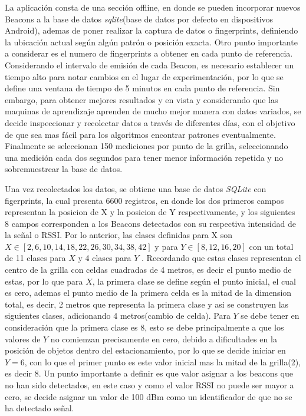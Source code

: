 La aplicación consta de una sección offline, en donde se pueden incorporar nuevos Beacons a la base de datos \textit{sqlite}(base de datos por defecto en dispositivos Android), ademas de poner realizar  la captura de datos o fingerprints, definiendo la ubicación actual según algún patrón o posición exacta. Otro punto importante a considerar es el numero de fingerprints a obtener en cada punto de referencia. Considerando el intervalo de emisión de cada Beacon, es necesario establecer un tiempo alto para notar cambios en el lugar de experimentación, por lo que se define una ventana de tiempo de 5 minutos en cada punto de referencia. Sin embargo, para obtener mejores resultados y en vista y considerando que las maquinas de aprendizaje aprenden de mucho mejor manera con datos variados, se decide inspeccionar y recolectar datos a través de diferentes días, con el objetivo de que sea mas fácil para los algoritmos encontrar patrones eventualmente. Finalmente se seleccionan 150 mediciones por punto de la grilla, seleccionando una medición cada dos segundos para tener menor información repetida y no sobremuestrear la base de datos.

Una vez recolectados los datos, se obtiene una base de datos \textit{SQLite} con figerprints, la cual presenta 6600 registros, en donde los dos primeros campos representan la posicion de X y la posicion de Y respectivamente, y los siguientes 8 campos corresponden a los Beacons detectados con su respectiva intensidad de la señal o RSSI. Por lo anterior, las clases definidas para X son $ X \in [2, 6, 10, 14, 18, 22, 26, 30 , 34, 38, 42]$ y para $Y \in [8, 12, 16, 20]$ con  un total de 11 clases para $X$ y 4 clases para $Y$ . Recordando que estas clases representan el centro de la grilla con celdas cuadradas de 4 metros, es decir el punto medio de estas, por lo que para $ X$, la primera clase se define según el punto inicial,  el cual es cero, ademas el  punto medio de la primera celda es la mitad de la dimension total, es decir, 2 metros que representa la primera clase y asi se construyen las siguientes clases, adicionando 4 metros(cambio de celda). Para $Y$ se debe tener en consideración que la primera clase es 8, esto se debe principalmente a que los valores de $ Y$ no comienzan precisamente en cero, debido a dificultades en la posición de objetos dentro del estacionamiento, por lo que se decide iniciar en $Y = 6$, con lo que el primer punto es este valor inicial mas la mitad de la grilla(2), es decir 8.  Un punto importante a definir es que valor asignar a los beacons que no han sido detectados, en este caso y como el valor RSSI no puede ser mayor a cero, se decide asignar un valor de 100 dBm como un identificador de que no se ha detectado señal.

